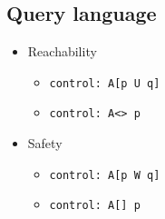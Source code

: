 \documentclass{article}
\begin{document}
		\subsection{Query language}
			\begin{itemize}
				\item Reachability
					\begin{itemize}
						\item \texttt{control: A[p U q]}
						\item \texttt{control: A<> p}
					\end{itemize}

				\item Safety
					\begin{itemize}
						\item \texttt{control: A[p W q]}
						\item \texttt{control: A[] p}
					\end{itemize}
			\end{itemize}
\end{document}
